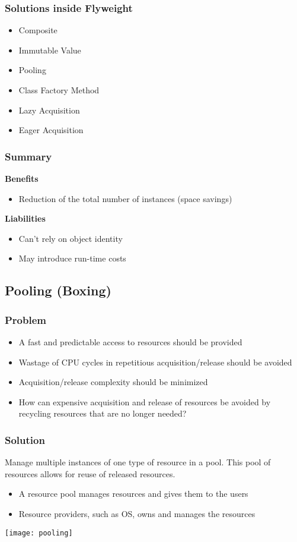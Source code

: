 \subsubsection{Solutions inside Flyweight}
\begin{itemize}[topsep=0pt]
    \itemsep -0.4em
    \item Composite
    \item Immutable Value
    \item Pooling
    \item Class Factory Method
    \item Lazy Acquisition
    \item Eager Acquisition
\end{itemize}
\subsubsection{Summary}
\textbf{Benefits}
\begin{itemize}[topsep=0pt]
    \itemsep -0.4em
    \item Reduction of the total number of instances (space savings)
\end{itemize}
\textbf{Liabilities}
\begin{itemize}[topsep=0pt]
    \itemsep -0.4em
    \item Can't rely on object identity
    \item May introduce run-time costs
\end{itemize}

\subsection{Pooling (Boxing)}
\subsubsection{Problem}
\begin{itemize}[topsep=0pt]
    \itemsep -0.4em
    \item A fast and predictable access to resources should be provided
    \item Wastage of CPU cycles in repetitious acquisition/release should be avoided
    \item Acquisition/release complexity should be minimized
    \item How can expensive acquisition and release of resources be avoided by recycling resources that are no longer needed?
\end{itemize}
\subsubsection{Solution}
Manage multiple instances of one type of resource in a pool. This pool of resources allows for reuse of released resources.
\begin{itemize}[topsep=0pt]
    \itemsep -0.4em
    \item A resource pool manages resources and gives them to the users
    \item Resource providers, such as OS, owns and manages the resources
\end{itemize}
\texttt{[image: pooling]}
